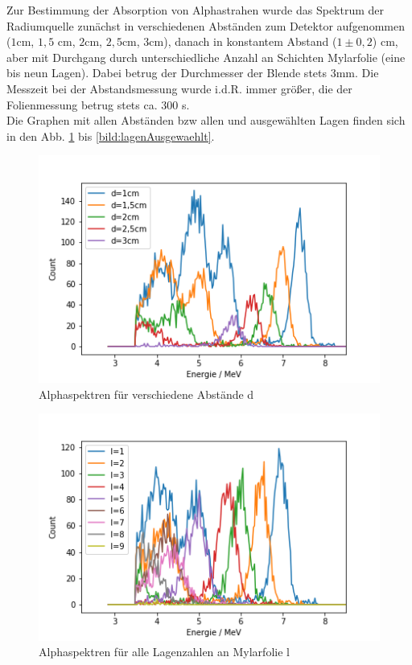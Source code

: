 Zur Bestimmung der Absorption von Alphastrahen wurde das Spektrum der Radiumquelle zunächst in verschiedenen Abständen zum Detektor 
aufgenommen ($1$cm, $1,5$ cm, $2$cm, $2,5$cm, $3$cm), danach in konstantem Abstand ($1 \pm 0,2$) cm, aber mit Durchgang durch 
unterschiedliche Anzahl an Schichten Mylarfolie (eine bis neun Lagen). 
Dabei betrug der Durchmesser der Blende stets $3$mm. Die Messzeit bei der Abstandsmessung wurde i.d.R. immer größer, die der 
Folienmessung betrug stets ca. $300$ s.\\

Die Graphen mit allen Abständen bzw allen und ausgewählten Lagen finden sich in den Abb. \ref{bild:abstandAlle} bis \ref{bild:lagenAusgewaehlt}. \\

\begin{figure}[h]
    \centering
    \includegraphics[scale=0.75]{Bilder/abstandAlle.png}
    \caption{Alphaspektren für verschiedene Abstände d}
    \label{bild:abstandAlle}
\end{figure}

\begin{figure}[h]
    \centering
    \includegraphics[scale=0.75]{Bilder/lagenAlle.png}
    \caption{Alphaspektren für alle Lagenzahlen an Mylarfolie l}
    \label{bild:lagenAlle}
\end{figure}

